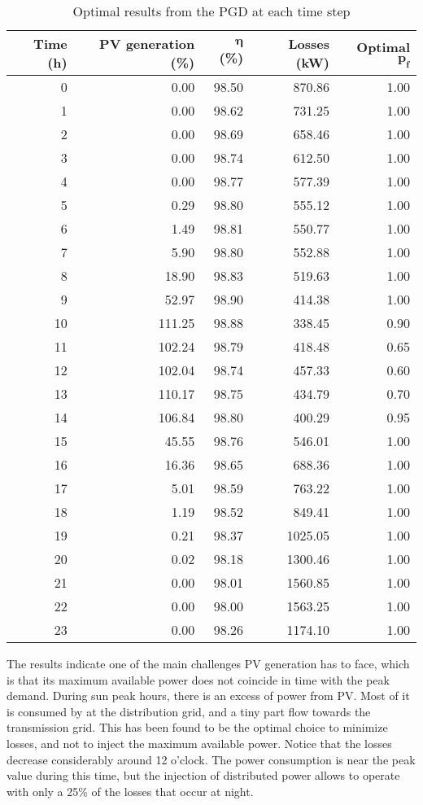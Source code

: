 \begin{table}[!htb]\centering
    \caption{Optimal results from the PGD at each time step}
    \begin{tabular}{rrrrr}
        \hline
        \textbf{Time (h)} & \textbf{PV generation (\%)} & $\bm{\eta}$ \textbf{(\%)} & \textbf{Losses (kW)} & \textbf{Optimal} $\bm{p_f}$ \\
        \hline
0 & 0.00 & 98.50 & 870.86 & 1.00\\
1 & 0.00 & 98.62 & 731.25 & 1.00\\
2 & 0.00 & 98.69 & 658.46 & 1.00\\
3 & 0.00 & 98.74 & 612.50 & 1.00\\
4 & 0.00 & 98.77 & 577.39 & 1.00\\
5 & 0.29 & 98.80 & 555.12 & 1.00\\
6 & 1.49 & 98.81 & 550.77 & 1.00\\
7 & 5.90 & 98.80 & 552.88 & 1.00\\
8 & 18.90 & 98.83 & 519.63 & 1.00\\
9 & 52.97 & 98.90 & 414.38 & 1.00\\
10 & 111.25 & 98.88 & 338.45 & 0.90\\
11 & 102.24 & 98.79 & 418.48 & 0.65\\
12 & 102.04 & 98.74 & 457.33 & 0.60\\
13 & 110.17 & 98.75 & 434.79 & 0.70\\
14 & 106.84 & 98.80 & 400.29 & 0.95\\
15 & 45.55 & 98.76 & 546.01 & 1.00\\
16 & 16.36 & 98.65 & 688.36 & 1.00\\
17 & 5.01 & 98.59 & 763.22 & 1.00\\
18 & 1.19 & 98.52 & 849.41 & 1.00\\
19 & 0.21 & 98.37 & 1025.05 & 1.00\\
20 & 0.02 & 98.18 & 1300.46 & 1.00\\
21 & 0.00 & 98.01 & 1560.85 & 1.00\\
22 & 0.00 & 98.00 & 1563.25 & 1.00\\
23 & 0.00 & 98.26 & 1174.10 & 1.00\\
        \hline
    \end{tabular}
    \label{tab:Sresu}
\end{table}
The results indicate one of the main challenges PV generation has to face, which is that its maximum available power does not coincide in time with the peak demand. During sun peak hours, there is an excess of power from PV. Most of it is consumed by at the distribution grid, and a tiny part flow towards the transmission grid. This has been found to be the optimal choice to minimize losses, and not to inject the maximum available power. Notice that the losses decrease considerably around 12 o'clock. The power consumption is near the peak value during this time, but the injection of distributed power allows to operate with only a 25\% of the losses that occur at night. 

